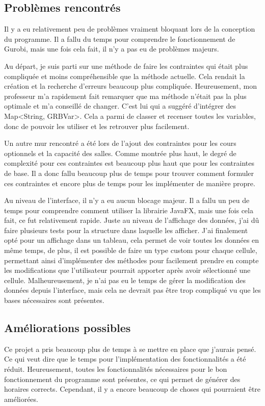 \subsection{Problèmes rencontrés}
Il y a eu relativement peu de problèmes vraiment bloquant lors de la conception du programme. Il a fallu du temps pour comprendre le fonctionnement de Gurobi, mais une fois cela fait, il n'y a pas eu de problèmes majeurs.

Au départ, je suis parti sur une méthode de faire les contraintes qui était plus compliquée et moins compréhensible que la méthode actuelle. Cela rendait la création et la recherche d'erreurs beaucoup plus compliquée. Heureusement, mon professeur m'a rapidement fait remarquer que ma méthode n'était pas la plus optimale et m'a conseillé de changer. C'est lui qui a suggéré d'intégrer des Map<String, GRBVar>. Cela a parmi de classer et recenser toutes les variables, donc de pouvoir les utiliser et les retrouver plus facilement.

Un autre mur rencontré a été lors de l'ajout des contraintes pour les cours optionnels et la capacité des salles. Comme montrée plus haut, le degré de complexité pour ces contraintes est beaucoup plus haut que pour les contraintes de base. Il a donc fallu beaucoup plus de temps pour trouver comment formuler ces contraintes et encore plus de temps pour les implémenter de manière propre.

Au niveau de l'interface, il n'y a eu aucun blocage majeur. Il a fallu un peu de temps pour comprendre comment utiliser la librairie JavaFX, mais une fois cela fait, ce fut relativement rapide. Juste au niveau de l'affichage des données, j'ai dû faire plusieurs tests pour la structure dans laquelle les afficher. J'ai finalement opté pour un affichage dans un tableau, cela permet de voir toutes les données en même temps, de plus, il est possible de faire un type custom pour chaque cellule, permettant ainsi d'implémenter des méthodes pour facilement prendre en compte les modifications que l'utilisateur pourrait apporter après avoir sélectionné une cellule. Malheureusement, je n'ai pas eu le temps de gérer la modification des données depuis l'interface, mais cela ne devrait pas être trop compliqué vu que les bases nécessaires sont présentes.

\subsection{Améliorations possibles}
Ce projet a pris beaucoup plus de temps à se mettre en place que j'aurais pensé. Ce qui veut dire que le temps pour l'implémentation des fonctionnalités a été réduit. Heureusement, toutes les fonctionnalités nécessaires pour le bon fonctionnement du programme sont présentes, ce qui permet de générer des horaires corrects. Cependant, il y a encore beaucoup de choses qui pourraient être améliorées.

